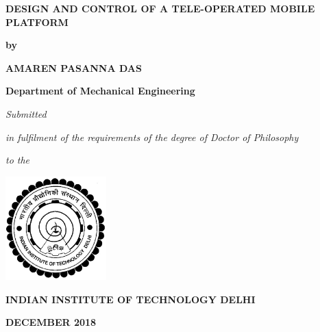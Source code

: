 \newpage
\thispagestyle{empty}
\begin{center}



\textbf{\large{DESIGN AND CONTROL OF A TELE-OPERATED MOBILE PLATFORM}}

\bigskip
\bigskip
\bigskip
\bigskip
\bigskip
\bigskip
\textbf{by}
\bigskip
\bigskip

\textbf{AMAREN PASANNA DAS}

\bigskip
\bigskip

\textbf{Department of Mechanical Engineering}

\bigskip
\bigskip
\bigskip
\bigskip
\bigskip
\bigskip


\textit{Submitted}

\textit{in fulfilment of the requirements of the degree of Doctor of Philosophy}

\bigskip
\bigskip

\textbf{}

\bigskip
\bigskip

\textit{to the}

\bigskip
\bigskip
\bigskip
\bigskip
\bigskip
\bigskip
\bigskip

\includegraphics[height=4cm]{Misc_front/iitlogo.eps}

\bigskip
\bigskip



\textbf{INDIAN INSTITUTE OF TECHNOLOGY DELHI}


\textbf{DECEMBER 2018}
\end{center}
\newpage
\thispagestyle{empty}
\mbox{}
\restoregeometry